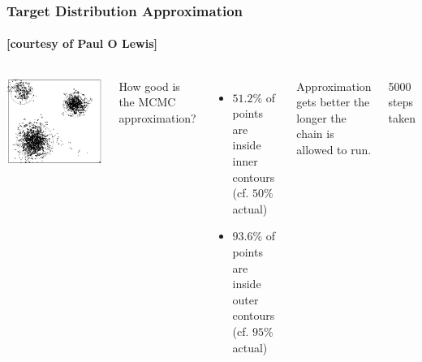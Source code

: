 \begin{frame}
\frametitle{Target Distribution Approximation}
\framesubtitle{[courtesy of Paul O Lewis]}

\begin{columns}


\includegraphics[width=\textwidth]{../images/targetDistributionApproximation}


\small{
How good is the MCMC approximation?

\begin{itemize}
\item $51.2\%$ of points are inside inner contours (cf. $50\%$ actual)
\item $93.6\%$ of points are inside outer contours (cf. $95\%$ actual)
\end{itemize}

Approximation gets better the longer the chain is allowed to run.

\medskip{}

5000 steps taken

}

\end{columns}

\end{frame}


